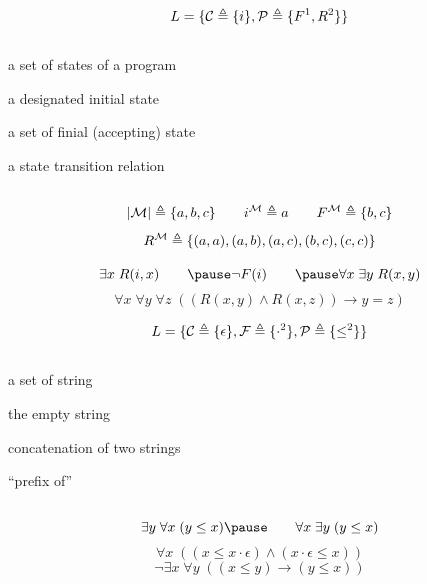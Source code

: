 \begin{frame}{}
  \[
    L = \{\mathcal{C} \triangleq \{i\},
      \mathcal{P} \triangleq \{F^{1}, R^{2}\}\}
  \]

  \pause
  \begin{columns}
      \begin{description}[$R^{\U}$:]
        \item[$|\U|$:] a set of states of a program
        \item[$i^{\U}$:] a designated initial state
        \item[$F^{\U}$:] a set of finial (accepting) state
        \item[$R^{\U}$:] a state transition relation
      \end{description}
  \end{columns}

  \pause
  \vspace{1em}
  \[
    |\mathcal{M}| \triangleq \{a, b, c\} \qquad
    i^{\mathcal{M}} \triangleq a \qquad
    F^{\mathcal{M}} \triangleq \{b, c\}
  \]
  \[
    R^{\mathcal{M}} \triangleq \{(a, a), (a, b), (a, c), (b, c), (c, c)\}
  \]

  \pause
  \vspace{0.80cm}
  \[
    \exists x\; R(i, x) \qquad\pause
    \lnot F(i) \qquad\pause
    \forall x\; \exists y\; R(x, y)
  \]
  \pause
  \[
    \forall x\; \forall y\; \forall z\;
      ((R(x, y) \land R(x, z)) \to y = z)
  \]
\end{frame}

\begin{frame}{}
  \[
    L = \{\mathcal{C} \triangleq \{\epsilon\},
      \mathcal{F} \triangleq \{\cdot^{2}\},
      \mathcal{P} \triangleq \{\le^{2}\}\}
  \]

  \pause
  \begin{columns}
      \begin{description}[$R^{\U}$:]
        \item[$|\U|$:] a set of string
        \item[$\epsilon^{\U}$:] the empty string
        \item[$\cdot^{\U}$:] concatenation of two strings
        \item[$\le^{\U}$:] ``prefix of''
      \end{description}
  \end{columns}

  \pause
  \vspace{0.80cm}
  \[
    \exists y\; \forall x\; (y \le x) \pause\qquad
    \forall x\; \exists y\; (y \le x)
  \]
  \pause
  \[
    \forall x\; ((x \le x \cdot \epsilon) \land (x \cdot \epsilon \le x))
  \]
  \pause
  \[
    \lnot\exists x\;\forall y\; ((x \le y) \to (y \le x))
  \]
\end{frame}

